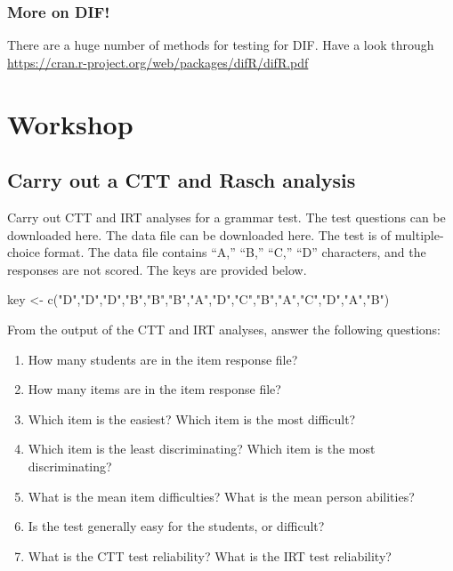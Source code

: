 \documentclass[
  letterpaper,
  DIV=11,
  numbers=noendperiod]{scrreprt}
\newenvironment{Shaded}{\begin{snugshade}}{\end{snugshade}}
\newcommand{\FunctionTok}[1]{\textcolor[rgb]{0.28,0.35,0.67}{#1}}
\newcommand{\NormalTok}[1]{\textcolor[rgb]{0.00,0.23,0.31}{#1}}
\newcommand{\OtherTok}[1]{\textcolor[rgb]{0.00,0.23,0.31}{#1}}
\newcommand{\StringTok}[1]{\textcolor[rgb]{0.13,0.47,0.30}{#1}}
\providecommand{\tightlist}{%
  \setlength{\itemsep}{0pt}\setlength{\parskip}{0pt}}\usepackage{longtable,booktabs,array}
\begin{document}
\hypertarget{more-on-dif}{%
\subsection{More on DIF!}\label{more-on-dif}}

There are a huge number of methods for testing for DIF. Have a look
through \url{https://cran.r-project.org/web/packages/difR/difR.pdf}

\hypertarget{workshop}{%
\chapter{Workshop}\label{workshop}}

\hypertarget{carry-out-a-ctt-and-rasch-analysis}{%
\section{Carry out a CTT and Rasch
analysis}\label{carry-out-a-ctt-and-rasch-analysis}}

Carry out CTT and IRT analyses for a grammar test. The test questions
can be downloaded here. The data file can be downloaded here. The test
is of multiple-choice format. The data file contains ``A,'' ``B,''
``C,'' ``D'' characters, and the responses are not scored. The keys are
provided below.

\begin{Shaded}
\begin{Highlighting}[]
\NormalTok{key }\OtherTok{\textless{}{-}} \FunctionTok{c}\NormalTok{(}\StringTok{"D"}\NormalTok{,}\StringTok{"D"}\NormalTok{,}\StringTok{"D"}\NormalTok{,}\StringTok{"B"}\NormalTok{,}\StringTok{"B"}\NormalTok{,}\StringTok{"B"}\NormalTok{,}\StringTok{"A"}\NormalTok{,}\StringTok{"D"}\NormalTok{,}\StringTok{"C"}\NormalTok{,}\StringTok{"B"}\NormalTok{,}\StringTok{"A"}\NormalTok{,}\StringTok{"C"}\NormalTok{,}\StringTok{"D"}\NormalTok{,}\StringTok{"A"}\NormalTok{,}\StringTok{"B"}\NormalTok{)}
\end{Highlighting}
\end{Shaded}

From the output of the CTT and IRT analyses, answer the following
questions:

\begin{enumerate}
\def\labelenumi{\arabic{enumi}.}
\tightlist
\item
  How many students are in the item response file?
\item
  How many items are in the item response file?
\item
  Which item is the easiest? Which item is the most difficult?
\item
  Which item is the least discriminating? Which item is the most
  discriminating?
\item
  What is the mean item difficulties? What is the mean person abilities?
\item
  Is the test generally easy for the students, or difficult?
\item
  What is the CTT test reliability? What is the IRT test reliability?
\end{enumerate}
\end{document}
